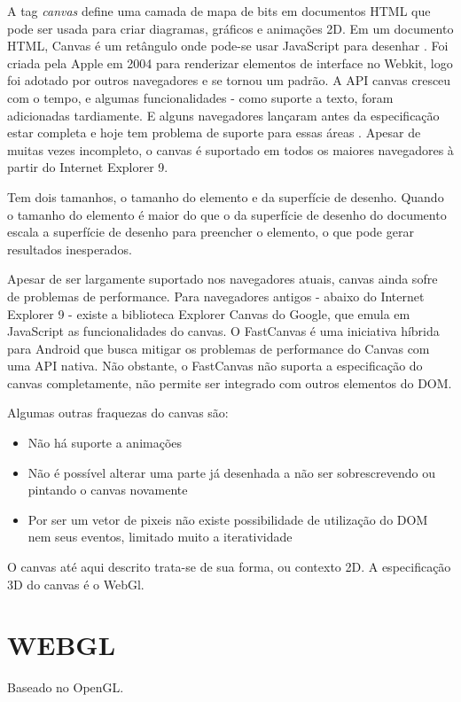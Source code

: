 \documentclass[
12pt,
a4paper,
portuges,
draft
]{report}
\begin{document}
A tag \textit{canvas} define uma camada de mapa de bits em documentos
HTML que pode ser usada para criar diagramas, gráficos e animações
2D. Em um documento HTML, Canvas é um retângulo onde pode-se usar
JavaScript para desenhar \autocite{diveIntohtml}. Foi criada pela Apple
em 2004 para renderizar elementos de interface no Webkit, logo foi
adotado por outros navegadores e se tornou um padrão. A API canvas
cresceu com o tempo, e algumas funcionalidades - como suporte a texto,
foram adicionadas tardiamente. E alguns navegadores lançaram antes
da especificação estar completa e hoje tem problema de suporte para
essas áreas \autocite{diveIntohtml}. Apesar de muitas vezes incompleto,
o canvas é suportado em todos os maiores navegadores à partir do
Internet Explorer 9.

Tem dois tamanhos, o tamanho do elemento e da superfície de
desenho. Quando o tamanho do elemento é maior do que o da superfície
de desenho do documento escala a superfície de desenho para preencher o
elemento, o que pode gerar resultados inesperados.

Apesar de ser largamente suportado nos navegadores atuais, canvas ainda
sofre de problemas de performance. Para navegadores antigos - abaixo do
Internet Explorer 9 - existe a biblioteca Explorer Canvas do Google, que
emula em JavaScript as funcionalidades do canvas. O FastCanvas é uma
iniciativa híbrida para Android que busca mitigar os problemas de
performance do Canvas com uma API nativa. Não obstante, o FastCanvas
não suporta a especificação do canvas completamente, não permite ser
integrado com outros elementos do DOM.

Algumas outras fraquezas do canvas são:
\begin{itemize}
\item{Não há suporte a animações}
\item{Não é possível alterar uma parte já desenhada a não ser sobrescrevendo ou pintando o canvas novamente}
\item{Por ser um vetor de pixeis não existe possibilidade de utilização do DOM nem seus eventos, limitado muito a iteratividade}
\end{itemize}

O canvas até aqui descrito trata-se de sua forma, ou contexto 2D. A
especificação 3D do canvas é o WebGl.


\section{WEBGL}
Baseado no OpenGL.
\end{document}
